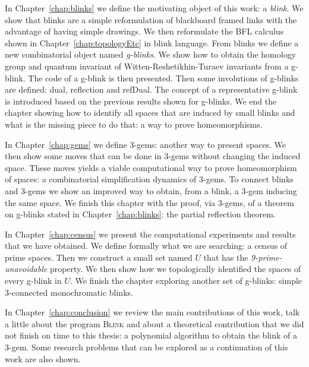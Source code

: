 In Chapter~\ref{chap:blinks} we define the motivating object of this
work: a {\it blink}. We show that blinks are a simple
reformulation of blackboard framed links with the advantage of having
simple drawings. We then reformulate the BFL calculus shown in
Chapter~\ref{chap:topologyEtc} in blink language. From
blinks we define a new combinatorial object named {\it g-blinks}. We show
how to obtain the homology group and quantum invariant of
Witten-Reshetikhin-Turaev invariants from a g-blink. The code
of a g-blink is then presented. Then some involutions
of g-blinks are defined: dual, reflection and refDual. The concept
of a representative g-blink is introduced based on the previous
results shown for g-blinks. We end the chapter showing how to
identify all spaces that are induced by small blinks and what
is the missing piece to do that: a way to prove homeomorphisms.

In Chapter~\ref{chap:gems} we define 3-gems: another way to present
spaces. We then show some moves that can be done in
3-gems without changing the induced space. These moves yields a
viable computational way to prove homeomorphism of spaces: a
combinatorial simplification dynamics of 3-gems. To connect blinks
and 3-gems we show an improved way to obtain, from a blink,
a 3-gem inducing the same space. We finish this chapter with the
proof, via 3-gems, of a theorem on g-blinks stated in
Chapter~\ref{chap:blinks}: the partial reflection theorem.

In Chapter~\ref{chap:census} we present the computational
experiments and results that we have obtained. We define formally
what we are searching: a census of prime spaces. Then we construct
a small set named $U$ that has the {\it 9-prime-unavoidable} property.
We then show how we topologically identified the spaces of every
g-blink in $U$. We finish the chapter exploring another set of
g-blinks: simple 3-connected monochromatic blinks.

In Chapter~\ref{chap:conclusion} we review the main contributions
of this work, talk a little about the program \textsc{Blink} and
about a theoretical contribution that we did not finish on
time to this thesis: a polynomial algorithm to obtain the blink
of a 3-gem. Some research problems that can be explored as a
continuation of this work are also shown.







